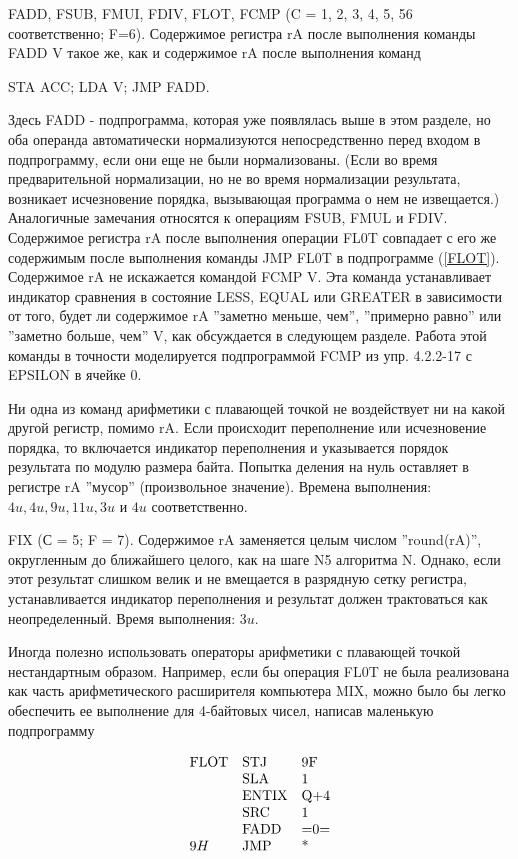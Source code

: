 {\point{} FADD, FSUB, FMUI, FDIV, FLOT, FCMP (C = 1, 2, 3, 4, 5, 56 соответственно; F=6). Содержимое регистра rA после выполнения команды FADD V такое же, как и содержимое rA после выполнения команд
\begin{center}
STA ACC; LDA V; JMP FADD.
\end{center}

Здесь FADD - подпрограмма, которая уже появлялась выше в этом разделе, но оба операнда автоматически нормализуются непосредственно перед входом в подпрограмму, если они еще не были нормализованы. (Если во время предварительной нормализации, но не во время нормализации результата, возникает исчезновение порядка, вызывающая программа о нем не извещается.) Аналогичные замечания относятся к операциям FSUB, FMUL и FDIV. Содержимое регистра rA после выполнения операции FL0T совпадает с его же содержимым после выполнения команды JMP FL0T в подпрограмме (\ref{FLOT}). Содержимое rA не искажается командой FCMP V. Эта команда устанавливает индикатор сравнения в состояние LESS, EQUAL или GREATER в зависимости от того, будет ли содержимое rA ''заметно меньше, чем'', ''примерно равно'' или ''заметно больше, чем'' V, как обсуждается в следующем разделе. Работа этой команды в точности моделируется подпрограммой FCMP из упр. 4.2.2-17 с EPSILON в ячейке 0.

Ни одна из команд арифметики с плавающей точкой не воздействует ни на какой другой регистр, помимо rA. Если происходит переполнение или исчезновение порядка, то включается индикатор переполнения и указывается порядок результата по модулю размера байта. Попытка деления на нуль оставляет в регистре rA ''мусор'' (произвольное значение). Времена выполнения: $4u, 4u, 9u, 11u, 3u$ и $4u$ соответственно.

\point{} FIX (С = 5; F = 7). Содержимое rA заменяется целым числом ''round(rA)'', округленным до ближайшего целого, как на шаге N5 алгоритма N. Однако, если этот результат слишком велик и не вмещается в разрядную сетку регистра, устанавливается индикатор переполнения и результат должен трактоваться как неопределенный. Время выполнения: $3u$.

Иногда полезно использовать операторы арифметики с плавающей точкой нестандартным образом. Например, если бы операция FL0T не была реализована как часть арифметического расширителя компьютера MIX, можно было бы легко обеспечить ее выполнение для 4-байтовых чисел, написав маленькую подпрограмму

\begin{equation}\label{FLAT}
\begin{array}{l l l} 
\text{FLOT} & \text{STJ} & \text{9F}\\
& \text{SLA} & 1\\
& \text{ENTIX} & \text{Q+4}\\
& \text{SRC} & 1\\
& \text{FADD} & \text{=0=}\\
9H & \text{JMP} & \text{*}\\
\end{array}
\end{equation}

}
